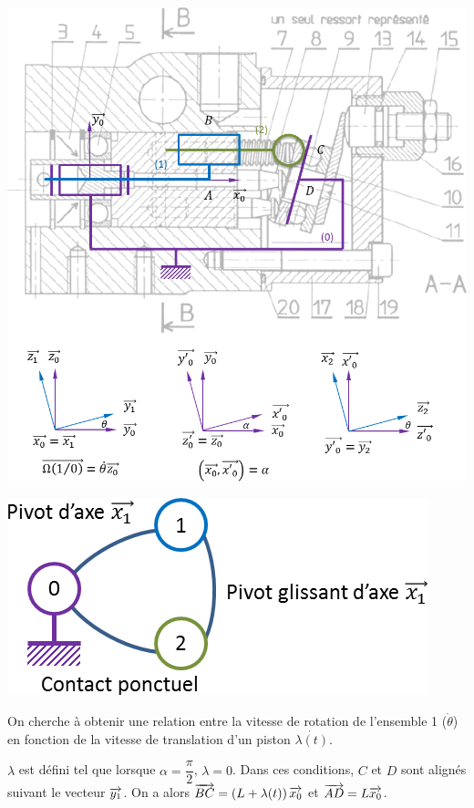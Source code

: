 \documentclass[10pt]{article}
\begin{document}
\begin{exemple}
\noindent\begin{minipage}[c]{.55\linewidth}
\begin{center}
\includegraphics[width=.9\textwidth]{images/pompe3}
\end{center}
\end{minipage}\hfill
\begin{minipage}[c]{.4\linewidth}
\begin{center}
\includegraphics[width=.95\textwidth]{images/pompe4}
\end{center}
\end{minipage}

On cherche à obtenir une relation entre la vitesse de rotation de l'ensemble 1 ($\dot{\theta}$) en fonction de la vitesse de translation d'un piston $\dot{\lambda(t)}$. 

$\lambda$ est défini tel que lorsque $\alpha=\dfrac{\pi}{2}$, $\lambda=0$. Dans ces conditions, $C$ et $D$ sont alignés suivant le vecteur $\overrightarrow{y_1}$. On a alors $\overrightarrow{BC} =\left( L+\lambda(t)\right) \overrightarrow{x_0}$ et $\overrightarrow{AD}=L\overrightarrow{x_0}$.


\end{exemple}
\end{document}
